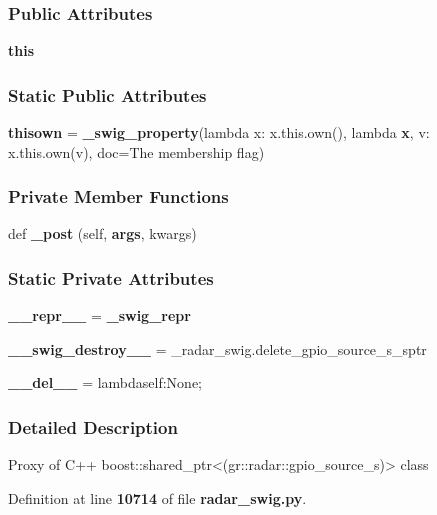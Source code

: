 \subsubsection*{Public Attributes}
\begin{DoxyCompactItemize}
\item 
{\bf this}
\end{DoxyCompactItemize}
\subsubsection*{Static Public Attributes}
\begin{DoxyCompactItemize}
\item 
{\bf thisown} = {\bf \+\_\+swig\+\_\+property}(lambda x\+: x.\+this.\+own(), lambda {\bf x}, v\+: x.\+this.\+own(v), doc=\textquotesingle{}The membership flag\textquotesingle{})
\end{DoxyCompactItemize}
\subsubsection*{Private Member Functions}
\begin{DoxyCompactItemize}
\item 
def {\bf \+\_\+post} (self, {\bf args}, kwargs)
\end{DoxyCompactItemize}
\subsubsection*{Static Private Attributes}
\begin{DoxyCompactItemize}
\item 
{\bf \+\_\+\+\_\+repr\+\_\+\+\_\+} = {\bf \+\_\+swig\+\_\+repr}
\item 
{\bf \+\_\+\+\_\+swig\+\_\+destroy\+\_\+\+\_\+} = \+\_\+radar\+\_\+swig.\+delete\+\_\+gpio\+\_\+source\+\_\+s\+\_\+sptr
\item 
{\bf \+\_\+\+\_\+del\+\_\+\+\_\+} = lambdaself\+:\+None;
\end{DoxyCompactItemize}


\subsubsection{Detailed Description}
\begin{DoxyVerb}Proxy of C++ boost::shared_ptr<(gr::radar::gpio_source_s)> class\end{DoxyVerb}
 

Definition at line {\bf 10714} of file {\bf radar\+\_\+swig.\+py}.



